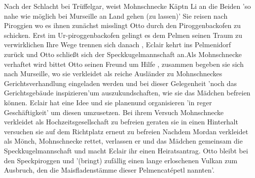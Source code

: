 Nach der Schlacht bei Trüffelgar, weist Mohnschnecke Käptn Li an die Beiden 'so nahe wie möglich bei Murseille an Land gehen (zu lassen)'\cite[S.464]{pir} Sie reisen nach Piroggien \cite[S.479]{pir} wo es ihnen zunächst misslingt Otto durch den Piroggenbackofen zu schicken\cite[S.488]{pir}. Erst im Ur-piroggenbackofen \cite[S.494]{pir} gelingt es dem Pelmen seinen Traum zu verwirklichen\cite[S.497ff]{pir} Ihre Wege trennen sich danach \cite[S.504f]{pir}, Eclair kehrt ins Pelmenidorf zurück \cite[S.515]{pir} und Otto schließt sich der Speckkugelmannschaft an.\cite[S.523ff]{pir}Als Mohnschnecke verhaftet wird \cite[S.550]{pir} bittet Otto seinen Freund um Hilfe \cite[S.555]{pir}, zusammen begeben sie sich nach Murseille, wo sie verkleidet als reiche Ausländer\cite[S.565]{pir} zu Mohnschneckes Gerichtsverhandlung eingeladen werden\cite[S.568]{pir} und bei dieser Gelegenheit 'noch das Gerichtsgebäude inspizieren'\cite[S.577]{pir}um auszukundschaften, wie sie das Mädchen befreien können.\cite[S.569ff]{pir} Eclair hat eine Idee\cite[S.580]{pir} und sie planen\cite[S.581]{pir}und organisieren 'in reger Geschäftigkeit'\cite[S.584]{pir} um diesen umzusetzen. Bei ihrem Versuch Mohnschnecke verkleidet als Hochzeitsgesellschaft zu befreien\cite[S.584ff]{pir} geraten sie in einen Hinterhalt\cite[S.593]{pir} versuchen sie auf dem Richtplatz erneut zu befreien\cite[S.607ff]{pir} Nachdem Mordan verkleidet als Mönch, Mohnschnecke rettet, \cite[S.614]{pir} verlassen er und das Mädchen gemeinsam die Speckkugelmannschaft\cite[S.639]{pir} und macht Eclair ihr einen Heiratsantrag. \cite[S.640]{pir} Otto bleibt bei den Speckpiroggen \cite[S.638]{pir} und '(bringt) zufällig einen lange erloschenen Vulkan zum Ausbruch, den die Maisfladenstämme dieser Pelmencatépetl nannten'.\cite[S.646]{pir}


